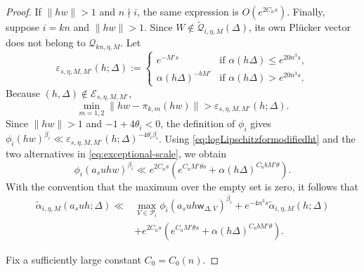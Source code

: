 \documentclass[reqno,11pt]{amsart}
\numberwithin{equation}{section}
\theoremstyle{definition}
\theoremstyle{remark}
\begin{document}
\begin{proof}
If $\|hw\|>1$ and $n\nmid i$, the same expression is
$O(e^{2C_ns})$. Finally, suppose $i=kn$ and $\|hw\|>1$. Since
$W\notin\widetilde{\mathscr Q}_{i,\eta,M}(\Delta)$, its own Pl\"ucker vector does not
belong to $\mathscr Q_{kn,\eta,M}$. Let
\begin{equation}\label{eq:exceptional-scale}
    \varepsilon_{s,\eta,M,M'}(h;\Delta)
:=
\begin{cases}
e^{-M's}
&\text{if } \alpha(h\Delta)
\le e^{20n^3s},\\ 
\alpha(h\Delta)^{-bM'}
&\text{if }\alpha(h\Delta)
>e^{20n^3s}.\end{cases}
\end{equation}  Because
$(h,\Delta)\notin\mathcal E_{s,\eta,M,M'}$,
$$
\min_{m=1,2}\|hw-\pi_{k,m}(hw)\|
>\varepsilon_{s,\eta,M,M'}(h;\Delta).
$$
Since $\|hw\|>1$ and $-1+4\theta_i<0$, the definition of $\phi_i$ gives
$\phi_i(hw)^{\beta_i}\ll
\varepsilon_{s,\eta,M,M'}(h;\Delta)^{-4\theta_i\beta_i}$.
Using \eqref{eq:logLipschitzformodifiedht} and the two alternatives in
\eqref{eq:exceptional-scale},
we obtain
\begin{equation}\label{eq:outside-P-error}
\phi_i(a_suhw)^{\beta_i}
\ll
e^{2C_ns}
\left(
 e^{C_nM'\theta s}
 +\alpha(h\Delta)^{C_nbM'\theta}
\right).
\end{equation}
With the convention that the maximum over the empty set is zero, it follows that
\begin{equation}\label{eq:competitor-reduction}
\begin{aligned}
\widetilde\alpha_{i,\eta,M}(a_suh;\Delta)
\ll{}&
\max_{V\in\mathcal P_i}
\phi_i(a_suh\mathsf w_{\Delta,V})^{\beta_i}
+e^{-4n^3s}\widetilde\alpha_{i,\eta,M}(h;\Delta)\\
&+e^{2C_ns}
\left(e^{C_nM'\theta s}+\alpha(h\Delta)^{C_nbM'\theta}\right).
\end{aligned}
\end{equation}

Fix a sufficiently large constant $C_0=C_0(n)$. 


\end{proof}
\end{document}
